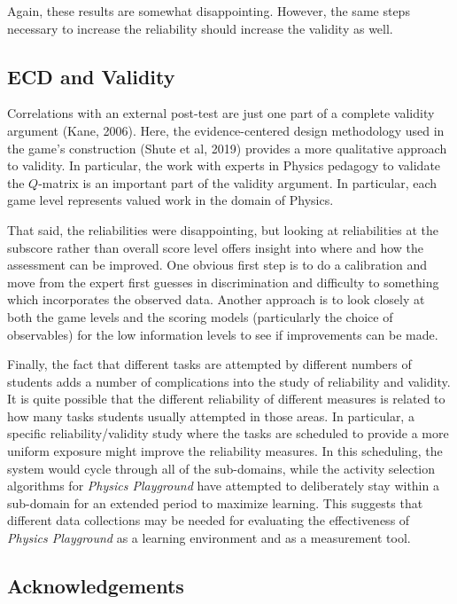 \documentclass[]{article}
\begin{document}
Again, these results are somewhat disappointing. However, the same steps
necessary to increase the reliability should increase the validity as
well.

\subsection{ECD and Validity}\label{ecd-and-validity}

Correlations with an external post-test are just one part of a complete
validity argument (Kane, 2006). Here, the evidence-centered design
methodology used in the game's construction (Shute et al, 2019) provides
a more qualitative approach to validity. In particular, the work with
experts in Physics pedagogy to validate the \(Q\)-matrix is an important
part of the validity argument. In particular, each game level represents
valued work in the domain of Physics.

That said, the reliabilities were disappointing, but looking at
reliabilities at the subscore rather than overall score level offers
insight into where and how the assessment can be improved. One obvious
first step is to do a calibration and move from the expert first guesses
in discrimination and difficulty to something which incorporates the
observed data. Another approach is to look closely at both the game
levels and the scoring models (particularly the choice of observables)
for the low information levels to see if improvements can be made.

Finally, the fact that different tasks are attempted by different
numbers of students adds a number of complications into the study of
reliability and validity. It is quite possible that the different
reliability of different measures is related to how many tasks students
usually attempted in those areas. In particular, a specific
reliability/validity study where the tasks are scheduled to provide a
more uniform exposure might improve the reliability measures. In this
scheduling, the system would cycle through all of the sub-domains, while
the activity selection algorithms for \emph{Physics Playground} have
attempted to deliberately stay within a sub-domain for an extended
period to maximize learning. This suggests that different data
collections may be needed for evaluating the effectiveness of
\emph{Physics Playground} as a learning environment and as a measurement
tool.

\subsection{Acknowledgements}\label{acknowledgements}
\end{document}
